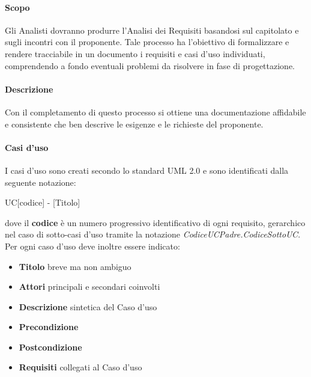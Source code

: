 \documentclass[12pt,a4paper]{article}
\begin{document}
\paragraph{Scopo}
Gli Analisti dovranno produrre l'Analisi dei Requisiti basandosi sul capitolato e sugli incontri con il proponente. Tale processo ha l'obiettivo di formalizzare e rendere tracciabile in un documento i requisiti e casi d'uso individuati, comprendendo a fondo eventuali problemi da risolvere in fase di progettazione.

\paragraph{Descrizione}
Con il completamento di questo processo si ottiene una documentazione affidabile e consistente che ben descrive le esigenze e le richieste del proponente.

\paragraph{Casi d'uso}
I casi d'uso sono creati secondo lo standard UML 2.0 e sono identificati dalla seguente notazione:
\begin{center}
UC[codice] - [Titolo]
\end{center}
dove il \textbf{codice} è un numero progressivo identificativo di ogni requisito, gerarchico nel  caso di sotto-casi d'uso tramite la notazione \textit{CodiceUCPadre.CodiceSottoUC}. Per ogni caso d'uso deve inoltre essere indicato:
\begin{itemize}
\item \textbf{Titolo} breve ma non ambiguo
\item \textbf{Attori} principali e secondari coinvolti
\item \textbf{Descrizione} sintetica del Caso d'uso
\item \textbf{Precondizione}
\item \textbf{Postcondizione}
\item \textbf{Requisiti} collegati al Caso d'uso
\end{itemize}
\end{document}
